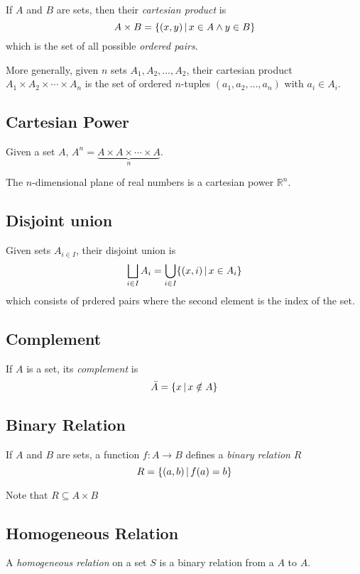 \documentclass{article}
\begin{document}
If \(A\) and \(B\) are sets, then their \textit{cartesian product} is
\[
    A\times B = \{(x,y) \,|\, x \in A \land y \in B\}
\]
which is the set of all possible \textit{ordered pairs}.

More generally, given \(n\) sets \(A_1, A_2, \ldots, A_2\),
their cartesian product \(A_1 \times A_2 \times \cdots \times A_n\)
is the set of ordered \(n\)-tuples \((a_1, a_2, \ldots, a_n)\) with \(a_i\in A_i\).

\subsection{Cartesian Power}

Given a set \(A\), \(A^n=\underbrace{A\times A\times \cdots \times A}_n\).

The \(n\)-dimensional plane of real numbers is a cartesian power \({\mathbb{R}}^n\).

\subsection{Disjoint union}

Given sets \(A_{i\in I}\), their disjoint union is
\[
    \bigsqcup_{i\in I}A_i= \bigcup_{i\in I}\{(x, i) \,|\, x \in A_i\}
\]
which consists of prdered pairs where the second element
is the index of the set.

\subsection{Complement}

If \(A\) is a set, its \textit{complement} is
\[
    \bar{A} = \{x \,|\, x \notin A\}
\]

\subsection{Binary Relation}

If \(A\) and \(B\) are sets, a function \(f:A\to B\)
defines a \textit{binary relation} \(R\)
\[
    R = \{(a,b) \,|\, f(a)=b\}
\]

Note that \(R\subseteq A\times B\)


\subsection{Homogeneous Relation}

A \textit{homogeneous relation} on a set \(S\) is a binary relation
from a \(A\) to \(A\).
\end{document}
